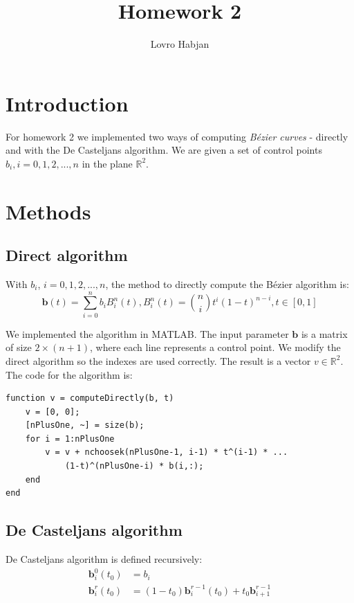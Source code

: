 \documentclass[]{article}
\title{Homework 2}
\author{Lovro Habjan}
\begin{document}
\maketitle

\section{Introduction}

For homework 2 we implemented two ways of computing \textit{B\'ezier curves} -
directly and with the De Casteljans algorithm. We are given a set of control
points $b_i, i = 0, 1, 2, ..., n$ in the plane $\mathbb{R}^2$.

\section{Methods}

\subsection{Direct algorithm}

With $b_i$, $i = 0, 1, 2, ..., n$, the method to directly compute the B\'ezier
algorithm is:
\begin{equation*} \textbf{b}(t) = \sum_{i = 0}^{n} b_i B^n_i (t), B^n_i(t) =
\binom{n}{i} t^i (1-t)^{n-i}, t \in [0, 1]
\end{equation*}

We implemented the algorithm in MATLAB. The input parameter $\textbf{b}$ is a
matrix of size $2 \times (n + 1)$, where each line represents a control
point. We modify the direct algorithm so the indexes are used correctly. The
result is a vector $v \in \mathbb{R}^2$. The code for the algorithm is:
\begin{lstlisting}
function v = computeDirectly(b, t)
    v = [0, 0];
    [nPlusOne, ~] = size(b);
    for i = 1:nPlusOne
        v = v + nchoosek(nPlusOne-1, i-1) * t^(i-1) * ...
            (1-t)^(nPlusOne-i) * b(i,:);
    end
end
\end{lstlisting}

\subsection{De Casteljans algorithm}

De Casteljans algorithm is defined recursively:
\begin{align*} \textbf{b}^0_i(t_0) &= b_i \\ \textbf{b}^r_i(t_0) &= (1 - t_0)
\textbf{b}^{r-1}_i(t_0) + t_0 \textbf{b}^{r-1}_{i+1}
\end{align*}
\end{document}
